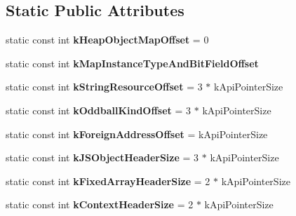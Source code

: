 \subsection*{Static Public Attributes}
\begin{DoxyCompactItemize}
\item 
\hypertarget{classv8_1_1internal_1_1_internals_a0902a596b5656b4592157eaacc020512}{}static const int {\bfseries k\+Heap\+Object\+Map\+Offset} = 0\label{classv8_1_1internal_1_1_internals_a0902a596b5656b4592157eaacc020512}

\item 
static const int {\bfseries k\+Map\+Instance\+Type\+And\+Bit\+Field\+Offset}
\item 
\hypertarget{classv8_1_1internal_1_1_internals_a8c2b35069864f567ca0c571310dd90a1}{}static const int {\bfseries k\+String\+Resource\+Offset} = 3 $\ast$ k\+Api\+Pointer\+Size\label{classv8_1_1internal_1_1_internals_a8c2b35069864f567ca0c571310dd90a1}

\item 
\hypertarget{classv8_1_1internal_1_1_internals_a98685d6861a07139720cd296f94f2b73}{}static const int {\bfseries k\+Oddball\+Kind\+Offset} = 3 $\ast$ k\+Api\+Pointer\+Size\label{classv8_1_1internal_1_1_internals_a98685d6861a07139720cd296f94f2b73}

\item 
\hypertarget{classv8_1_1internal_1_1_internals_ad4134449ee39b95e5ac035996aa7d66b}{}static const int {\bfseries k\+Foreign\+Address\+Offset} = k\+Api\+Pointer\+Size\label{classv8_1_1internal_1_1_internals_ad4134449ee39b95e5ac035996aa7d66b}

\item 
\hypertarget{classv8_1_1internal_1_1_internals_af8faf3ff3271d26bafa6ca0ea87e2a57}{}static const int {\bfseries k\+J\+S\+Object\+Header\+Size} = 3 $\ast$ k\+Api\+Pointer\+Size\label{classv8_1_1internal_1_1_internals_af8faf3ff3271d26bafa6ca0ea87e2a57}

\item 
\hypertarget{classv8_1_1internal_1_1_internals_a715ca62a5ddceac28d43c470db067675}{}static const int {\bfseries k\+Fixed\+Array\+Header\+Size} = 2 $\ast$ k\+Api\+Pointer\+Size\label{classv8_1_1internal_1_1_internals_a715ca62a5ddceac28d43c470db067675}

\item 
\hypertarget{classv8_1_1internal_1_1_internals_aa5187d7653158ef851c53594e6e63851}{}static const int {\bfseries k\+Context\+Header\+Size} = 2 $\ast$ k\+Api\+Pointer\+Size\label{classv8_1_1internal_1_1_internals_aa5187d7653158ef851c53594e6e63851}


\end{DoxyCompactItemize}
